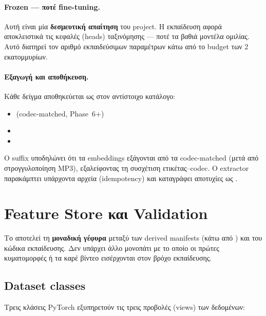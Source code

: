 \paragraph{Frozen — ποτέ fine-tuning.}
Αυτή είναι μία \textbf{δεσμευτική απαίτηση} του project.
Η εκπαίδευση αφορά αποκλειστικά τις κεφαλές (heads) ταξινόμησης —
ποτέ τα βαθιά μοντέλα ομιλίας.
Αυτό διατηρεί τον αριθμό εκπαιδεύσιμων παραμέτρων κάτω από το
budget των 2 εκατομμυρίων.

\paragraph{Εξαγωγή και αποθήκευση.}
Κάθε δείγμα αποθηκεύεται ως  στον αντίστοιχο
κατάλογο:
\begin{itemize}
  \item {} (codec-matched, Phase~6+)
  \item {}
  \item {}
\end{itemize}

Ο suffix  υποδηλώνει ότι τα embeddings εξάγονται από τα
codec-matched  (μετά από στρογγυλοποίηση MP3), εξαλείφοντας
τη συσχέτιση ετικέτας–codec.
Ο extractor παρακάμπτει υπάρχοντα αρχεία (idempotency) και καταγράφει
αποτυχίες ως .

\section{Feature Store και Validation}
\label{sec:feature-store}

Το  αποτελεί τη \textbf{μοναδική γέφυρα}
μεταξύ των derived manifests (κάτω από ) και του
κώδικα εκπαίδευσης.
Δεν υπάρχει άλλο μονοπάτι με το οποίο οι πρώτες κυματομορφές ή τα καρέ
βίντεο εισέρχονται στον βρόχο εκπαίδευσης.

\subsection*{Dataset classes}

Τρεις κλάσεις PyTorch  εξυπηρετούν τις τρεις
προβολές (views) των δεδομένων:

